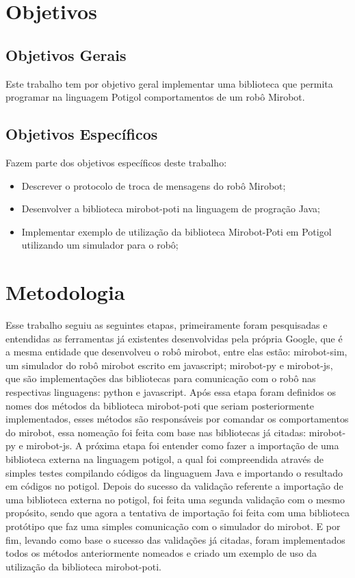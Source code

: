 \section{Objetivos}

\subsection{Objetivos Gerais}

Este trabalho tem por objetivo geral implementar uma biblioteca que permita
programar na linguagem Potigol comportamentos de um robô Mirobot.

\subsection{Objetivos Específicos}

Fazem parte dos objetivos específicos deste trabalho:

\begin{itemize} \item Descrever o protocolo de troca de mensagens do robô
    Mirobot; \item Desenvolver a biblioteca mirobot-poti na linguagem de
    progração Java; \item Implementar exemplo de utilização da biblioteca
      Mirobot-Poti em Potigol utilizando um simulador para o robô;
\end{itemize}


\section{Metodologia}

Esse trabalho seguiu as seguintes etapas, primeiramente foram pesquisadas e
entendidas as ferramentas já existentes desenvolvidas pela própria Google, que
é a mesma entidade que desenvolveu o robô mirobot, entre elas estão:
mirobot-sim, um simulador do robô mirobot escrito em javascript; mirobot-py e
mirobot-js, que são implementações das bibliotecas para comunicação com o robô
nas respectivas linguagens: python e javascript. Após essa etapa foram
definidos os nomes dos métodos da biblioteca mirobot-poti que seriam
posteriormente implementados, esses métodos são responsáveis por comandar os
comportamentos do mirobot, essa nomeação foi feita com base nas bibliotecas já
citadas: mirobot-py e mirobot-js. A próxima etapa foi entender como fazer a
importação de uma biblioteca externa na linguagem potigol, a qual foi
compreendida através de simples testes compilando códigos da linguaguem Java e
importando o resultado em códigos no potigol. Depois do sucesso da validação
referente a importação de uma biblioteca externa no potigol, foi feita uma
segunda validação com o mesmo propósito, sendo que agora a tentativa de
importação foi feita com uma biblioteca protótipo que faz uma simples
comunicação com o simulador do mirobot. E por fim, levando como base o sucesso
das validações já citadas, foram implementados todos os métodos anteriormente
nomeados e criado um exemplo de uso da utilização da biblioteca mirobot-poti.

